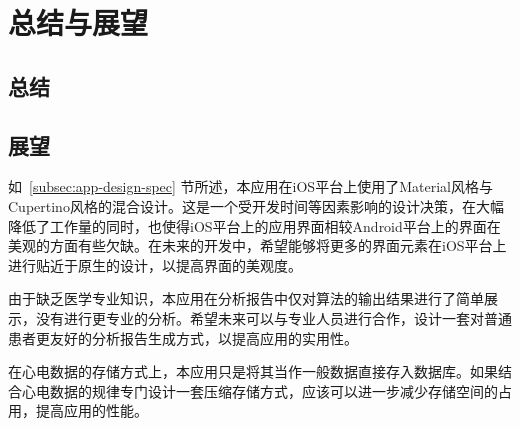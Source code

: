 \chapter{总结与展望}\label{ch:conc}


\section{总结}\label{sec:conc}



\section{展望}\label{sec:pros}


如~\ref{subsec:app-design-spec} 节所述，本应用在iOS平台上使用了Material风格与Cupertino风格的混合设计。这是一个受开发时间等因素影响的设计决策，在大幅降低了工作量的同时，也使得iOS平台上的应用界面相较Android平台上的界面在美观的方面有些欠缺。在未来的开发中，希望能够将更多的界面元素在iOS平台上进行贴近于原生的设计，以提高界面的美观度。

由于缺乏医学专业知识，本应用在分析报告中仅对算法的输出结果进行了简单展示，没有进行更专业的分析。希望未来可以与专业人员进行合作，设计一套对普通患者更友好的分析报告生成方式，以提高应用的实用性。

在心电数据的存储方式上，本应用只是将其当作一般数据直接存入数据库。如果结合心电数据的规律专门设计一套压缩存储方式，应该可以进一步减少存储空间的占用，提高应用的性能。
